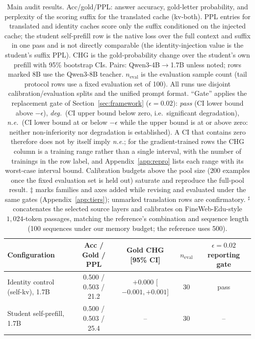 \documentclass{article} %
\begin{document}
\begin{table}[t]
\centering
\caption{Main audit results. Acc/gold/PPL: answer accuracy,
gold-letter probability, and perplexity of the scoring suffix for
the translated cache (kv-both). PPL entries for translated and identity
caches score only the suffix conditioned on the injected cache; the student
self-prefill row is the native loss over the full context and suffix in one
pass and is not directly comparable (the identity-injection value is the
student's suffix PPL). CHG is the gold-probability change
over the student's own prefill with 95\% bootstrap CIs. Pairs:
Qwen3-4B$\to$1.7B unless noted; rows marked 8B use the Qwen3-8B
teacher. $n_{\mathrm{eval}}$ is the evaluation sample count (tail
protocol rows use a fixed evaluation set of 100). All runs use
disjoint calibration/evaluation splits and the unified prompt
format. ``Gate'' applies the replacement gate of
Section~\ref{sec:framework} ($\epsilon{=}0.02$): \emph{pass} (CI lower bound
above $-\epsilon$), \emph{deg.}\ (CI upper bound below zero, i.e.\ significant
degradation), \emph{n.e.}\ (CI lower bound at or below $-\epsilon$ while the
upper bound is at or above zero: neither non-inferiority nor degradation is
established). A CI that contains zero therefore does not by itself imply
\emph{n.e.}; for the gradient-trained rows the CHG column is a training range
rather than a single interval, with the number of trainings in the row label,
and Appendix~\ref{app:repro} lists each range with its worst-case interval
bound. Calibration budgets above the pool size ($200$
examples once the fixed evaluation set is held out) saturate and reproduce the
full-pool result.
$\ddagger$ marks families and axes added while revising and evaluated under the
same gates (Appendix~\ref{app:tiers}); unmarked translation rows are
confirmatory. $^{\sharp}$ concatenates the selected source layers and
calibrates on FineWeb-Edu-style $1{,}024$-token passages, matching the
reference's combination and sequence length (100 sequences under our
memory budget; the reference uses 500).}
\label{tab:main}
\scriptsize
\setlength{\tabcolsep}{3pt}
\begin{tabular}{lcccc}
\toprule
Configuration & Acc / Gold / PPL & Gold CHG [95\% CI] & $n_{\mathrm{eval}}$ & $\epsilon{=}0.02$ reporting gate \\
\midrule
Identity control (self-kv), 1.7B & 0.500 / 0.503 / 21.2 & $+0.000$ [$-0.001, +0.001$] & 30 & pass \\
Student self-prefill, 1.7B & 0.500 / 0.503 / 25.4 & -- & 30 & -- \\

\end{tabular}
\end{table}
\end{document}
